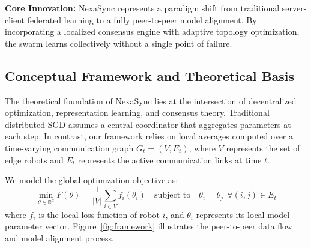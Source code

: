 \begin{tcolorbox}[
    colback=lightgrey,
    colframe=arcaccent,
    leftrule=3pt, rightrule=0pt, toprule=0pt, bottomrule=0pt,
    arc=0mm,
    boxrule=0pt,
    left=10pt, right=10pt, top=8pt, bottom=8pt
]
    \small\sffamily
    \textbf{Core Innovation:} NexaSync represents a paradigm shift from traditional server-client federated learning to a fully peer-to-peer model alignment. By incorporating a localized consensus engine with adaptive topology optimization, the swarm learns collectively without a single point of failure.
\end{tcolorbox}

\subsection{Conceptual Framework and Theoretical Basis}
The theoretical foundation of NexaSync lies at the intersection of decentralized optimization, representation learning, and consensus theory. Traditional distributed SGD assumes a central coordinator that aggregates parameters at each step. In contrast, our framework relies on local averages computed over a time-varying communication graph $G_t = (V, E_t)$, where $V$ represents the set of edge robots and $E_t$ represents the active communication links at time $t$. 

We model the global optimization objective as:
\[
\min_{\theta \in \mathbb{R}^d} F(\theta) = \frac{1}{|V|} \sum_{i \in V} f_i(\theta_i) \quad \text{subject to} \quad \theta_i = \theta_j \ \ \forall (i,j) \in E_t
\]
where $f_i$ is the local loss function of robot $i$, and $\theta_i$ represents its local model parameter vector. Figure~\ref{fig:framework} illustrates the peer-to-peer data flow and model alignment process.

